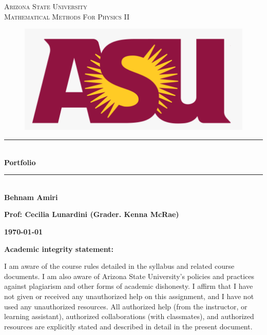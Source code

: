 \documentclass[fleqn]{article}
\begin{document}
\begin{titlepage}

\newcommand{\HRule}{\rule{\linewidth}{0.5mm}}

\center
 

\textsc{\LARGE Arizona State University}\\[1.5cm] 

\textsc{\LARGE Mathematical Methods For Physics II }\\[1.5cm]


\begin{figure}
  \includegraphics[width=\linewidth]{asu.png}
\end{figure}


\HRule \\[0.4cm]
{ \huge \bfseries Portfolio}\\[0.4cm] 
\HRule \\[1.5cm]
 
\textbf{Behnam Amiri}

\bigbreak

\textbf{Prof: Cecilia Lunardini (Grader. Kenna McRae)}

\bigbreak


\textbf{{\large \today}\\[2cm]}

\vfill

\end{titlepage}

\huge \textbf{Academic integrity statement:}

\bigbreak

\Large I am aware of the course rules detailed in the syllabus and related course documents. I am also aware of Arizona State University’s policies and practices against plagiarism and other forms of academic dishonesty. I affirm that I have not given or received any unauthorized help on this assignment, and I have not used any unauthorized resources. All authorized help (from the instructor, or learning assistant), authorized collaborations (with classmates), and authorized resources are explicitly stated and described in detail in the present document.
\end{document}
